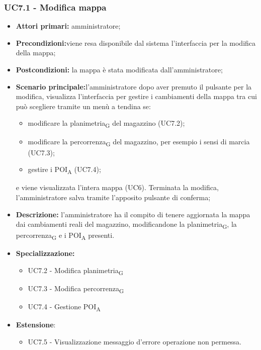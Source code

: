 \subsubsection{UC7.1 - Modifica mappa}
\begin{itemize}
	\item 	\textbf{Attori primari:} amministratore;
	\item 	\textbf{Precondizioni:}viene resa disponibile dal sistema l’interfaccia per la modifica della mappa;
	\item 	\textbf{Postcondizioni:} la mappa è stata modificata dall’amministratore;
	\item 	\textbf{Scenario principale:}l’amministratore dopo aver premuto il pulsante per la modifica, visualizza l’interfaccia per gestire i cambiamenti della mappa tra cui può scegliere tramite un menù a tendina se:
	\begin{itemize}
		\item modificare la \gls{planimetria}\textsubscript{G} del magazzino (UC7.2);
		\item modificare la \gls{percorrenza}\textsubscript{G} del magazzino, per esempio i sensi di marcia (UC7.3);
		\item gestire i \acrshort{POI}\textsubscript{A} (UC7.4);
	\end{itemize}
	e viene visualizzata l’intera mappa (UC6).
Terminata la modifica, l’amministratore salva tramite l’apposito pulsante di conferma;
	\item 	\textbf{Descrizione:} l’amministratore ha il compito di tenere aggiornata la mappa dai cambiamenti reali del magazzino, modificandone la \gls{planimetria}\textsubscript{G}, la \gls{percorrenza}\textsubscript{G} e i \acrshort{POI}\textsubscript{A} presenti.
	\item 	\textbf{Specializzazione:} 
	\begin{itemize}
		\item UC7.2 - Modifica \gls{planimetria}\textsubscript{G}
		\item UC7.3 - Modifica \gls{percorrenza}\textsubscript{G}
		\item UC7.4 - Gestione \acrshort{POI}\textsubscript{A}
	\end{itemize}
	\item \textbf{Estensione}:
	\begin{itemize}
		\item UC7.5 - Visualizzazione messaggio d’errore operazione non permessa.
	\end{itemize}
\end{itemize}


